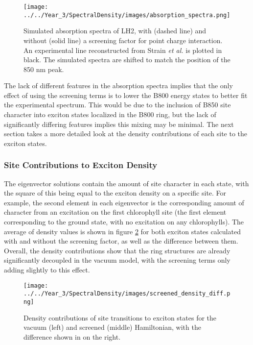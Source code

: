 \begin{figure}
    \centering
    \texttt{[image: ../../Year\_3/SpectralDensity/images/absorption\_spectra.png]}
    \caption{Simulated absorption spectra of LH2, with (dashed line) and without 
    (solid line) a screening factor for point charge interaction. An experimental
    line reconstructed from Strain \emph{et al.} \cite{Strain1963} is plotted in
    black. The simulated spectra are shifted to match the position of the 850 nm
    peak.}
    \label{fig:LH2_abs_spec}
\end{figure}

The lack of different features in the absorption spectra implies that the only effect
of using the screening terms is to lower the B800 energy states to better fit the
experimental spectrum. This would be due to the inclusion of B850 site character
into exciton states localized in the B800 ring, but the lack of significantly differing
features implies this mixing may be minimal. The next section takes a more detailed
look at the density contributions of each site to the exciton states.

\subsubsection{Site Contributions to Exciton Density}
\label{subsubsec:site_dens}

The eigenvector solutions contain the amount of site character in each state, with
the square of this being equal to the exciton density on a specific site. For example,
the second element in each eigenvector is the corresponding amount of character 
from an excitation on the first chlorophyll site (the first element corresponding
to the ground state, with no excitation on any chlorophylls). The average of density
values is shown in figure \ref{fig:LH2_density} for both exciton states calculated
with and without the screening factor, as well as the difference between them. 
Overall, the density contributions show that the ring structures are already significantly
decoupled in the vacuum model, with the screening terms only adding slightly to 
this effect.

\begin{figure}
    \centering
    \texttt{[image: ../../Year\_3/SpectralDensity/images/screened\_density\_diff.png]}
    \caption{Density contributions of site transitions to exciton states for the
    vacuum (left) and screened (middle) Hamiltonian, with the difference shown in
    on the right.}
    \label{fig:LH2_density}
\end{figure}

